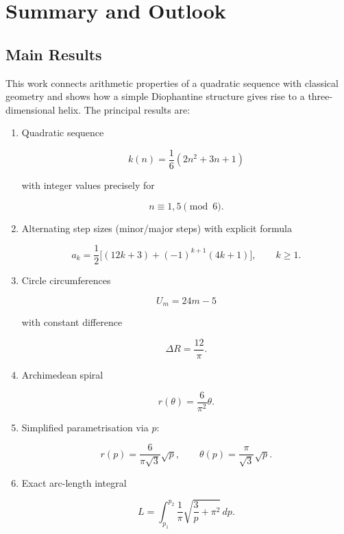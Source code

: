 \chapter{Summary and Outlook}\label{sec:zusammenfassung}

\section{Main Results}

This work connects arithmetic properties of a quadratic sequence with
classical geometry and shows how a simple Diophantine structure gives
rise to a three-dimensional helix. The principal results are:

\begin{enumerate}
\item Quadratic sequence


\[
k(n) = \frac{1}{6}(2n^2 + 3n + 1)
\]


with integer values precisely for


\[
n \equiv 1,5 \pmod{6}.
\]



\item Alternating step sizes (minor/major steps) with explicit formula


\[
a_k = \frac{1}{2}\bigl[(12k+3) + (-1)^{k+1}(4k+1)\bigr], \qquad k \geq 1.
\]



\item Circle circumferences


\[
U_m = 24m - 5
\]


with constant difference


\[
\Delta R = \frac{12}{\pi}.
\]



\item Archimedean spiral


\[
r(\theta) = \frac{6}{\pi^2}\theta.
\]



\item Simplified parametrisation via $p$:


\[
r(p) = \frac{6}{\pi\sqrt{3}}\sqrt{p},
\qquad
\theta(p) = \frac{\pi}{\sqrt{3}}\sqrt{p}.
\]



\item Exact arc-length integral


\[
L = \int_{p_1}^{p_2}
\frac{1}{\pi}\sqrt{\frac{3}{p} + \pi^2}\, dp.
\]




\end{enumerate}

